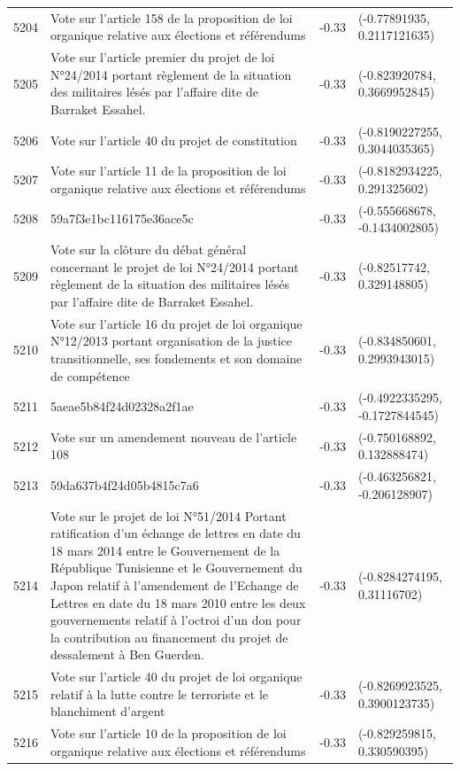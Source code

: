 \begin{table}[ht]
\begin{tabular}{rlrl}
  5204 & Vote sur l'article 158 de la proposition de loi organique relative aux élections et référendums & -0.33 & (-0.77891935, 0.2117121635) \\ 
  5205 & Vote sur l'article premier du projet de loi N°24/2014 portant règlement de la situation des militaires lésés par l’affaire dite de Barraket Essahel. & -0.33 & (-0.823920784, 0.3669952845) \\ 
  5206 & Vote sur l'article 40 du projet de constitution & -0.33 & (-0.8190227255, 0.3044035365) \\ 
  5207 & Vote sur l'article 11 de la proposition de loi organique relative aux élections et référendums & -0.33 & (-0.8182934225, 0.291325602) \\ 
  5208 & 59a7f3e1bc116175e36ace5c & -0.33 & (-0.555668678, -0.1434002805) \\ 
  5209 & Vote sur la clôture du débat général concernant le projet de loi N°24/2014 portant règlement de la situation des militaires lésés par l’affaire dite de Barraket Essahel. & -0.33 & (-0.82517742, 0.329148805) \\ 
  5210 & Vote sur l'article 16 du projet de loi organique N°12/2013 portant organisation de la justice transitionnelle, ses fondements et son domaine de compétence & -0.33 & (-0.834850601, 0.2993943015) \\ 
  5211 & 5aeae5b84f24d02328a2f1ae & -0.33 & (-0.4922335295, -0.1727844545) \\ 
  5212 & Vote sur un amendement nouveau de l'article 108 & -0.33 & (-0.750168892, 0.132888474) \\ 
  5213 & 59da637b4f24d05b4815c7a6 & -0.33 & (-0.463256821, -0.206128907) \\ 
  5214 & Vote sur le projet de loi N°51/2014 Portant ratification d’un échange de lettres en date du 18 mars 2014 entre le Gouvernement de la République Tunisienne et le Gouvernement du Japon relatif à l’amendement de l’Echange de Lettres en date du 18 mars 2010 entre les deux gouvernements relatif à l’octroi d’un don pour la contribution au financement du projet de dessalement à Ben Guerden. & -0.33 & (-0.8284274195, 0.31116702) \\ 
  5215 & Vote sur l'article 40 du projet de loi organique relatif à la lutte contre le terroriste et le blanchiment d'argent & -0.33 & (-0.8269923525, 0.3900123735) \\ 
  5216 & Vote sur l'article 10 de la proposition de loi organique relative aux élections et référendums & -0.33 & (-0.829259815, 0.330590395) \\ 

\end{tabular}
\end{table}
